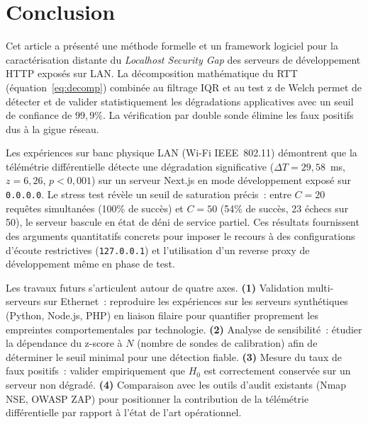 \documentclass[10pt,conference,compsoc]{IEEEtran}
\begin{document}
\section{Conclusion}
\label{sec:conclusion}

Cet article a présenté une méthode formelle et un framework logiciel
pour la caractérisation distante du \textit{Localhost Security Gap} des
serveurs de développement HTTP exposés sur LAN. La décomposition
mathématique du RTT (équation~\eqref{eq:decomp}) combinée au filtrage
IQR et au test z de Welch permet de détecter et de valider statistiquement
les dégradations applicatives avec un seuil de confiance de $99{,}9\%$.
La vérification par double sonde élimine les faux positifs dus à la
gigue réseau.

Les expériences sur banc physique LAN (Wi-Fi IEEE~802.11) démontrent
que la télémétrie différentielle détecte une dégradation significative
($\Delta T = 29{,}58$~ms, $z = 6{,}26$, $p < 0{,}001$) sur un serveur
Next.js en mode développement exposé sur \texttt{0.0.0.0}. Le stress
test révèle un seuil de saturation précis~: entre $C = 20$ requêtes
simultanées (100\% de succès) et $C = 50$ (54\% de succès, 23 échecs
sur 50), le serveur bascule en état de déni de service partiel. Ces
résultats fournissent des arguments quantitatifs concrets pour imposer
le recours à des configurations d'écoute restrictives
(\texttt{127.0.0.1}) et l'utilisation d'un reverse proxy de
développement même en phase de test.

Les travaux futurs s'articulent autour de quatre axes. \textbf{(1)}
Validation multi-serveurs sur Ethernet~: reproduire les expériences sur
les serveurs synthétiques (Python, Node.js, PHP) en liaison filaire
pour quantifier proprement les empreintes comportementales par
technologie. \textbf{(2)} Analyse de sensibilité~: étudier la
dépendance du z-score à $N$ (nombre de sondes de calibration) afin de
déterminer le seuil minimal pour une détection fiable. \textbf{(3)}
Mesure du taux de faux positifs~: valider empiriquement que $H_0$ est
correctement conservée sur un serveur non dégradé. \textbf{(4)}
Comparaison avec les outils d'audit existants (Nmap NSE, OWASP ZAP)
pour positionner la contribution de la télémétrie différentielle par
rapport à l'état de l'art opérationnel.
\end{document}
